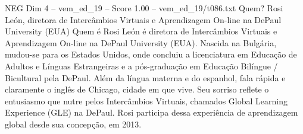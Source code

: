 \begin{textsample}{NEG Dim 4 – vem\_ed\_19 – Score 1.00 – vem\_ed\_19/t086.txt}  \label{ex:f4_neg_057}
Quem?
Rosi León, diretora de Intercâmbios Virtuais e Aprendizagem On-line na DePaul University (EUA) Quem é Rosi León é diretora de Intercâmbios Virtuais e Aprendizagem On-line na DePaul University (EUA).
Nascida na Bulgária, mudou-se para os Estados Unidos, onde concluiu a licenciatura em Educação de Adultos e Línguas Estrangeiras e a pós-graduação em Educação Bilíngue / Bicultural pela DePaul.
Além da língua materna e do espanhol, fala rápida e claramente o inglês de Chicago, cidade em que vive.
Seu sorriso reflete o entusiasmo que nutre pelos Intercâmbios Virtuais, chamados Global Learning Experience (GLE) na DePaul.
Rosi participa dessa experiência de aprendizagem global desde sua concepção, em 2013.

\end{textsample}
